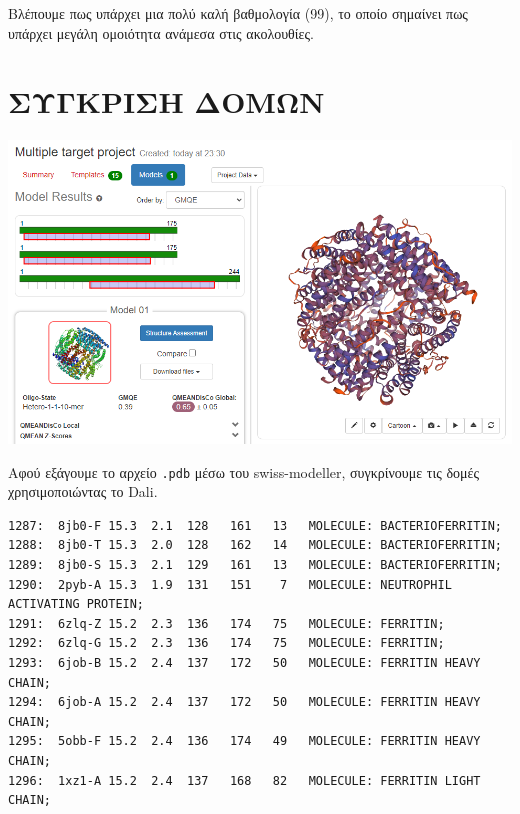         Βλέπουμε πως υπάρχει μια πολύ καλή βαθμολογία (99), το οποίο σημαίνει πως υπάρχει μεγάλη ομοιότητα ανάμεσα στις ακολουθίες.

    \section{ΣΥΓΚΡΙΣΗ ΔΟΜΩΝ}

        \begin{center} \noindent
            \includegraphics[scale=0.7]{img/swiss-modeller}
        \end{center}

            Αφού εξάγουμε το αρχείο \texttt{.pdb} μέσω του swiss-modeller, συγκρίνουμε τις δομές χρησιμοποιώντας το Dali.

    \begin{graycomment} \footnotesize
    \begin{verbatim}
1287:  8jb0-F 15.3  2.1  128   161   13   MOLECULE: BACTERIOFERRITIN;
1288:  8jb0-T 15.3  2.0  128   162   14   MOLECULE: BACTERIOFERRITIN;
1289:  8jb0-S 15.3  2.1  129   161   13   MOLECULE: BACTERIOFERRITIN;
1290:  2pyb-A 15.3  1.9  131   151    7   MOLECULE: NEUTROPHIL ACTIVATING PROTEIN;
1291:  6zlq-Z 15.2  2.3  136   174   75   MOLECULE: FERRITIN;
1292:  6zlq-G 15.2  2.3  136   174   75   MOLECULE: FERRITIN;
1293:  6job-B 15.2  2.4  137   172   50   MOLECULE: FERRITIN HEAVY CHAIN;
1294:  6job-A 15.2  2.4  137   172   50   MOLECULE: FERRITIN HEAVY CHAIN;
1295:  5obb-F 15.2  2.4  136   174   49   MOLECULE: FERRITIN HEAVY CHAIN;
1296:  1xz1-A 15.2  2.4  137   168   82   MOLECULE: FERRITIN LIGHT CHAIN;\end{verbatim}
    \end{graycomment}